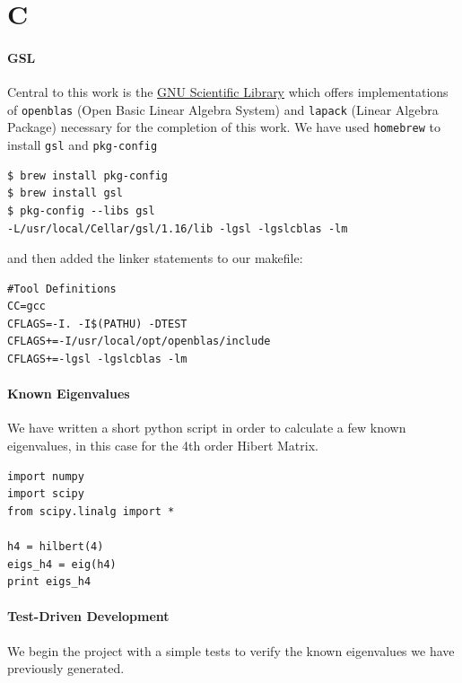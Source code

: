 \documentclass[12pt,]{book}
\let\oldparagraph\paragraph
\renewcommand{\paragraph}[1]{\oldparagraph{#1}\mbox{}}
\begin{document}
\section{C}\label{c}

\paragraph{GSL}

Central to this work is the \href{http://www.gnu.org/software/gsl/}{GNU
Scientific Library} which offers implementations of \texttt{openblas}
(Open Basic Linear Algebra System) and \texttt{lapack} (Linear Algebra
Package) necessary for the completion of this work. We have used
\texttt{homebrew} to install \texttt{gsl} and \texttt{pkg-config}

\begin{verbatim}
$ brew install pkg-config
$ brew install gsl
$ pkg-config --libs gsl
-L/usr/local/Cellar/gsl/1.16/lib -lgsl -lgslcblas -lm
\end{verbatim}

and then added the linker statements to our makefile:

\begin{verbatim}
#Tool Definitions
CC=gcc
CFLAGS=-I. -I$(PATHU) -DTEST
CFLAGS+=-I/usr/local/opt/openblas/include
CFLAGS+=-lgsl -lgslcblas -lm
\end{verbatim}

\paragraph{Known Eigenvalues}

We have written a short python script in order to calculate a few known
eigenvalues, in this case for the 4th order Hibert Matrix.

\begin{verbatim}
import numpy
import scipy
from scipy.linalg import *

h4 = hilbert(4)
eigs_h4 = eig(h4)
print eigs_h4
\end{verbatim}

\paragraph{Test-Driven Development}

We begin the project with a simple tests to verify the known eigenvalues
we have previously generated.
\end{document}
